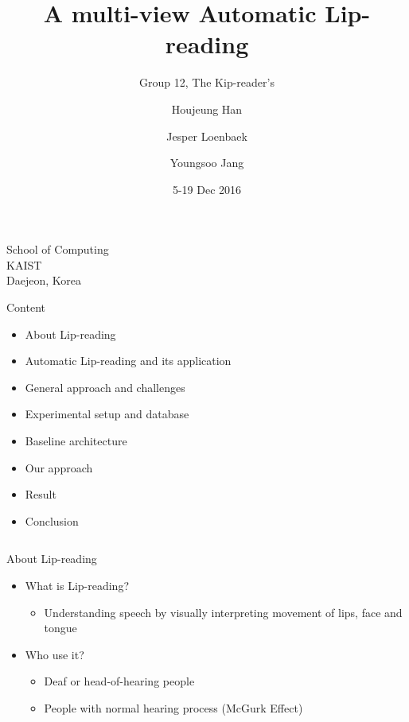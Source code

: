 \documentclass{beamer}
\begin{document}
\title{A multi-view Automatic Lip-reading}
\subtitle{Group 12, The Kip-reader's}
\author{Houjeung Han \and Jesper Loenbaek \and Youngsoo Jang}
\institute%
{
    School of Computing\\
    KAIST\\
    Daejeon, Korea
}

\date{5-19 Dec 2016}
\frame{\titlepage}

\begin{frame}{Content}
    \begin{itemize}
        \item About Lip-reading
        \item Automatic Lip-reading and its application
        \item General approach and challenges
        \item Experimental setup and database
        \item Baseline architecture
        \item Our approach
        \item Result 
        \item Conclusion 
    \end{itemize}
    \vspace{0.5cm}
    \begin{columns}[T]
    \end{columns}
\end{frame}

\begin{frame}{About Lip-reading}
    \begin{itemize}
        \item What is Lip-reading?
        \begin{itemize}
            \item Understanding speech by visually interpreting movement of lips, face and tongue
        \end{itemize}
    \end{itemize}
    \begin{itemize}
        \item Who use it?
        \begin{itemize}
            \item Deaf or head-of-hearing people
            \item People with normal hearing process (McGurk Effect)
        \end{itemize}
    \end{itemize}
\end{frame}
\end{document}
